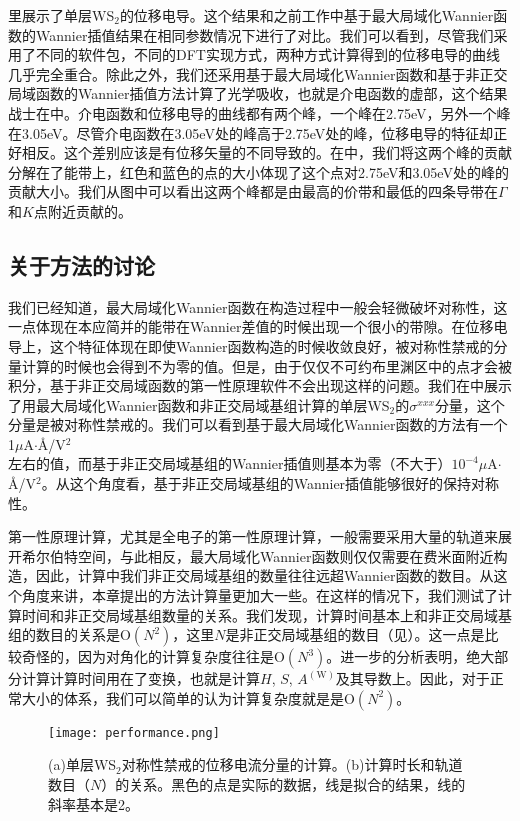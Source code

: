 里展示了单层WS$_2$的位移电导。这个结果和之前工作中基于最大局域化Wannier函数的Wannier插值结果在相同参数情况下进行了对比。我们可以看到，尽管我们采用了不同的软件包，不同的DFT实现方式，两种方式计算得到的位移电导的曲线几乎完全重合。除此之外，我们还采用基于最大局域化Wannier函数和基于非正交局域函数的Wannier插值方法计算了光学吸收，也就是介电函数的虚部，这个结果战士在中。介电函数和位移电导的曲线都有两个峰，一个峰在2.75eV，另外一个峰在3.05eV。尽管介电函数在3.05eV处的峰高于2.75eV处的峰，位移电导的特征却正好相反。这个差别应该是有位移矢量的不同导致的。在中，我们将这两个峰的贡献分解在了能带上，红色和蓝色的点的大小体现了这个点对2.75eV和3.05eV处的峰的贡献大小。我们从图中可以看出这两个峰都是由最高的价带和最低的四条导带在$\Gamma$和$K$点附近贡献的。


\subsection{关于方法的讨论}

我们已经知道，最大局域化Wannier函数在构造过程中一般会轻微破坏对称性，这一点体现在本应简并的能带在Wannier差值的时候出现一个很小的带隙。在位移电导上，这个特征体现在即使Wannier函数构造的时候收敛良好，被对称性禁戒的分量计算的时候也会得到不为零的值。但是，由于仅仅不可约布里渊区中的点才会被积分，基于非正交局域函数的第一性原理软件不会出现这样的问题。我们在中展示了用最大局域化Wannier函数和非正交局域基组计算的单层WS$_2$的$\sigma^{xxx}$分量，这个分量是被对称性禁戒的。我们可以看到基于最大局域化Wannier函数的方法有一个1$\mu$A$\cdot$\AA/V$^2$左右的值，而基于非正交局域基组的Wannier插值则基本为零（不大于）$10^{-4}\mu$A$\cdot$\AA/V$^2$。从这个角度看，基于非正交局域基组的Wannier插值能够很好的保持对称性。

第一性原理计算，尤其是全电子的第一性原理计算，一般需要采用大量的轨道来展开希尔伯特空间，与此相反，最大局域化Wannier函数则仅仅需要在费米面附近构造，因此，计算中我们非正交局域基组的数量往往远超Wannier函数的数目。从这个角度来讲，本章提出的方法计算量更加大一些。在这样的情况下，我们测试了计算时间和非正交局域基组数量的关系。我们发现，计算时间基本上和非正交局域基组的数目的关系是$\text{O}(N^2)$，这里$N$是非正交局域基组的数目（见）。这一点是比较奇怪的，因为对角化的计算复杂度往往是$\text{O}(N^3)$。进一步的分析表明，绝大部分计算计算时间用在了变换，也就是计算$H$, $S$, $A^{(\text{W})}$及其导数上。因此，对于正常大小的体系，我们可以简单的认为计算复杂度就是是$\text{O}(N^2)$。

\begin{figure}
    \texttt{[image: performance.png]}
    \centering
    \caption{(a)单层WS$_2$对称性禁戒的位移电流分量的计算。(b)计算时长和轨道数目（$N$）的关系。黑色的点是实际的数据，线是拟合的结果，线的斜率基本是2。\label{fig:performance}}
    \end{figure}
